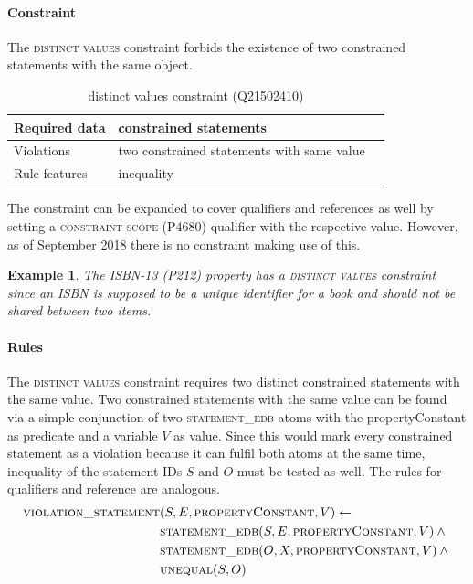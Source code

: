 \documentclass[hyperref,bachelorofscience,fleqn]{cgvpub}
\newtheorem{example}{Example}
\begin{document}
\paragraph{Constraint}
The \textsc{distinct values} constraint forbids the existence of two constrained statements with the same object.
\begin{table}[H]
\caption{distinct values constraint (Q21502410)}
\begin{tabularx}{\textwidth}{ ll X}
\hline
Required data & constrained statements \\
\hline
Violations & two constrained statements with same value \\
\hline
Rule features & inequality \\
\hline
\end{tabularx}
\end{table}
The constraint can be expanded to cover qualifiers and references as well by setting a \textsc{constraint scope} (P4680) qualifier with the respective value. However, as of September 2018 there is no constraint making use of this.

\begin{example}
The \textsc{ISBN-13} (P212) property has a \textsc{distinct values} constraint since an ISBN is supposed to be a unique identifier for a book and should not be shared between two items.
\end{example}

\paragraph{Rules}
The \textsc{distinct values} constraint requires two distinct constrained statements with the same value. 
Two constrained statements with the same value can be found via a simple conjunction of two \textsc{statement\_edb} atoms with the propertyConstant as predicate and a variable \(V\) as value. Since this would mark every constrained statement as a violation because it can fulfil both atoms at the same time, inequality of the statement IDs \(S\) and \(O\) must be tested as well. The rules for qualifiers and reference are analogous.
\begin{align}
\begin{split}
\textsc{violation\_statement}&(S, E, \textsc{propertyConstant}, V) \leftarrow \\
&\textsc{statement\_edb}(S, E, \textsc{propertyConstant}, V) \wedge{} \\
&\textsc{statement\_edb}(O, X, \textsc{propertyConstant}, V) \wedge{} \\
&\textsc{unequal}(S, O)
\end{split}
\end{align}
\end{document}
